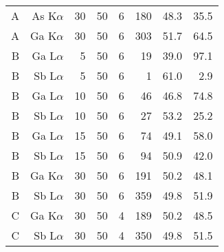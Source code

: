 \begin{table}[phtb]
\begin{center}
\begin{tabular}{rrrrrrrr}
            A               & As K$\alpha$       & 30             & 50             & 6           & 180               & 48.3                 & 35.5                          \\
            A               & Ga K$\alpha$       & 30             & 50             & 6           & 303               & 51.7                 & 64.5                          \\
            \hline
            B               & Ga L$\alpha$       & 5              & 50             & 6           & 19                & 39.0                 & 97.1                          \\
            B               & Sb L$\alpha$       & 5              & 50             & 6           & 1                 & 61.0                 & 2.9                           \\
            B               & Ga L$\alpha$       & 10             & 50             & 6           & 46                & 46.8                 & 74.8                          \\
            B               & Sb L$\alpha$       & 10             & 50             & 6           & 27                & 53.2                 & 25.2                          \\
            B               & Ga L$\alpha$       & 15             & 50             & 6           & 74                & 49.1                 & 58.0                          \\
            B               & Sb L$\alpha$       & 15             & 50             & 6           & 94                & 50.9                 & 42.0                          \\
            B               & Ga K$\alpha$       & 30             & 50             & 6           & 191               & 50.2                 & 48.1                          \\
            B               & Sb L$\alpha$       & 30             & 50             & 6           & 359               & 49.8                 & 51.9                          \\
            \hline
            C               & Ga K$\alpha$       & 30             & 50             & 4           & 189               & 50.2                 & 48.5                          \\
            C               & Sb L$\alpha$       & 30             & 50             & 4           & 350               & 49.8                 & 51.5                          \\

\end{tabular}
\end{center}
\end{table}

